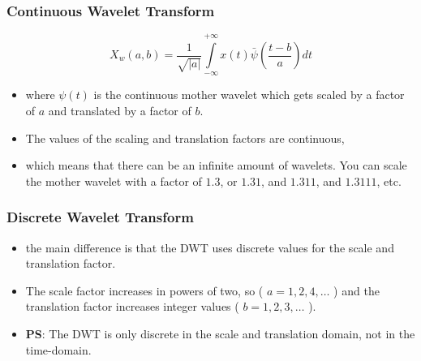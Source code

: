 \documentclass{beamer}
\begin{document}
\begin{frame}
	\frametitle{Continuous Wavelet Transform}
	
	
	\[
	X_w(a,b) = \frac{1}{\sqrt{|a|}}\int\limits_{-\infty}^{+\infty}x(t)
	\bar{\psi}\left(\frac{t-b}{a}\right)dt
	\]
	
	\begin{itemize}
		\item 
		where $\psi(t)$ is the continuous mother wavelet which gets scaled by a factor of $a$ and translated by a factor of $b$. 
		\item
		The values of the scaling and translation factors are continuous,
		
		\item
		
		which means that there can be an infinite amount of wavelets. You can scale the mother wavelet with a factor of $1.3$, or $1.31$, and $1.311$, and $1.3111$, etc.
		
	\end{itemize}
	
\end{frame}

\begin{frame}
	\frametitle{Discrete Wavelet Transform}
	
	\begin{itemize}
		\item 
		the main difference is that the DWT uses discrete values for the scale and translation factor. 
		\item
		The scale factor increases in powers of two, so ( $a = 1, 2, 4, \dots$ ) and the translation factor increases integer values ( $b = 1, 2, 3, \dots$ ).
		\item
		
		\textbf{PS}:  The DWT is only discrete in the scale and translation domain, not in the time-domain. 
		
	\end{itemize}
	
\end{frame}
\end{document}

